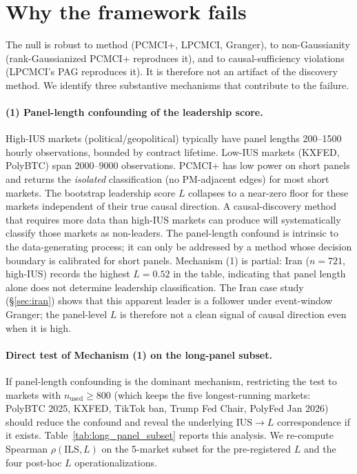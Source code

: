 \documentclass{article}
\begin{document}
\section{Why the framework fails}
\label{sec:why}

The null is robust to method (PCMCI+, LPCMCI, Granger), to non-Gaussianity (rank-Gaussianized PCMCI+ reproduces it), and to causal-sufficiency violations (LPCMCI's PAG reproduces it). It is therefore not an artifact of the discovery method. We identify three substantive mechanisms that contribute to the failure.

\paragraph{(1) Panel-length confounding of the leadership score.}
High-IUS markets (political/geopolitical) typically have panel lengths 200--1500 hourly observations, bounded by contract lifetime. Low-IUS markets (KXFED, PolyBTC) span 2000--9000 observations. PCMCI+ has low power on short panels and returns the \emph{isolated} classification (no PM-adjacent edges) for most short markets. The bootstrap leadership score $L$ collapses to a near-zero floor for these markets independent of their true causal direction. A causal-discovery method that requires more data than high-IUS markets can produce will systematically classify those markets as non-leaders. The panel-length confound is intrinsic to the data-generating process; it can only be addressed by a method whose decision boundary is calibrated for short panels. Mechanism (1) is partial: Iran ($n = 721$, high-IUS) records the highest $L = 0.52$ in the table, indicating that panel length alone does not determine leadership classification. The Iran case study (\S\ref{sec:iran}) shows that this apparent leader is a follower under event-window Granger; the panel-level $L$ is therefore not a clean signal of causal direction even when it is high.

\paragraph{Direct test of Mechanism (1) on the long-panel subset.}
If panel-length confounding is the dominant mechanism, restricting the test to markets with $n_\text{used} \ge 800$ (which keeps the five longest-running markets: PolyBTC 2025, KXFED, TikTok ban, Trump Fed Chair, PolyFed Jan 2026) should reduce the confound and reveal the underlying $\mathrm{IUS} \to L$ correspondence if it exists. Table~\ref{tab:long_panel_subset} reports this analysis. We re-compute Spearman $\rho(\mathrm{ILS}, L)$ on the 5-market subset for the pre-registered $L$ and the four post-hoc $L$ operationalizations.
\end{document}
